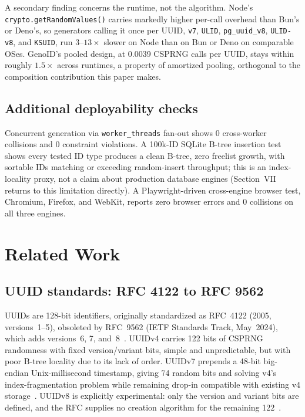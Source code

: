 \documentclass[conference]{IEEEtran}
\begin{document}
A secondary finding concerns the runtime, not the algorithm. Node's \texttt{crypto.getRandomValues()} carries markedly higher per-call overhead than Bun's or Deno's, so generators calling it once per UUID, \texttt{v7}, \texttt{ULID}, \texttt{pg\_uuid\_v8}, \texttt{ULID-v8}, and \texttt{KSUID}, run $3$--$13\times$ slower on Node than on Bun or Deno on comparable OSes. GenoID's pooled design, at 0.0039 CSPRNG calls per UUID, stays within roughly $1.5\times$ across runtimes, a property of amortized pooling, orthogonal to the composition contribution this paper makes.

\subsection{Additional deployability checks}
Concurrent generation via \texttt{worker\_threads} fan-out shows 0 cross-worker collisions and 0 constraint violations. A 100k-ID SQLite B-tree insertion test shows every tested ID type produces a clean B-tree, zero freelist growth, with sortable IDs matching or exceeding random-insert throughput; this is an index-locality proxy, not a claim about production database engines (Section~VII returns to this limitation directly). A Playwright-driven cross-engine browser test, Chromium, Firefox, and WebKit, reports zero browser errors and 0 collisions on all three engines.

\section{Related Work}
\subsection{UUID standards: RFC 4122 to RFC 9562}
UUIDs are 128-bit identifiers, originally standardized as RFC~4122 (2005, versions~1--5), obsoleted by RFC~9562 (IETF Standards Track, May~2024), which adds versions~6, 7, and~8~\cite{1}. UUIDv4 carries 122 bits of CSPRNG randomness with fixed version/variant bits, simple and unpredictable, but with poor B-tree locality due to its lack of order. UUIDv7 prepends a 48-bit big-endian Unix-millisecond timestamp, giving 74 random bits and solving v4's index-fragmentation problem while remaining drop-in compatible with existing v4 storage~\cite[\S5.7]{1}. UUIDv8 is explicitly experimental: only the version and variant bits are defined, and the RFC supplies no creation algorithm for the remaining 122~\cite[\S5.8]{1}.
\end{document}
